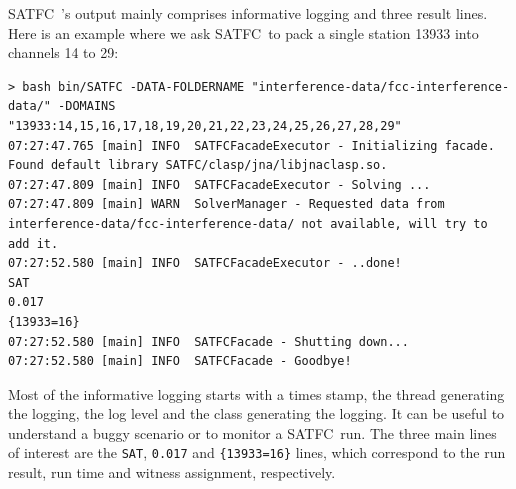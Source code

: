 \documentclass[
10pt, %
letterpaper, %
oneside, %
headinclude,footinclude, %
BCOR5mm, %
needspace, %
]{scrartcl}
\newcommand{\SATFC}{\textsc{SATFC}~}
\begin{document}
\SATFC's output mainly comprises informative logging and three result lines. Here is an example where we ask \SATFC to pack a single station 13933 into channels 14 to 29:
\begin{lstlisting}[style=Bash]
> bash bin/SATFC -DATA-FOLDERNAME "interference-data/fcc-interference-data/" -DOMAINS "13933:14,15,16,17,18,19,20,21,22,23,24,25,26,27,28,29"
07:27:47.765 [main] INFO  SATFCFacadeExecutor - Initializing facade.
Found default library SATFC/clasp/jna/libjnaclasp.so.
07:27:47.809 [main] INFO  SATFCFacadeExecutor - Solving ...
07:27:47.809 [main] WARN  SolverManager - Requested data from interference-data/fcc-interference-data/ not available, will try to add it.
07:27:52.580 [main] INFO  SATFCFacadeExecutor - ..done!
SAT
0.017
{13933=16}
07:27:52.580 [main] INFO  SATFCFacade - Shutting down...
07:27:52.580 [main] INFO  SATFCFacade - Goodbye!
\end{lstlisting}
Most of the informative logging starts with a times stamp, the thread generating the logging, the log level and the class generating the logging. It can be useful to understand a buggy scenario or to monitor a \SATFC run. The three main lines of interest are the \texttt{SAT}, \texttt{0.017} and \texttt{\{13933=16\}} lines, which correspond to the run result, run time and witness assignment, respectively. 
\end{document}
